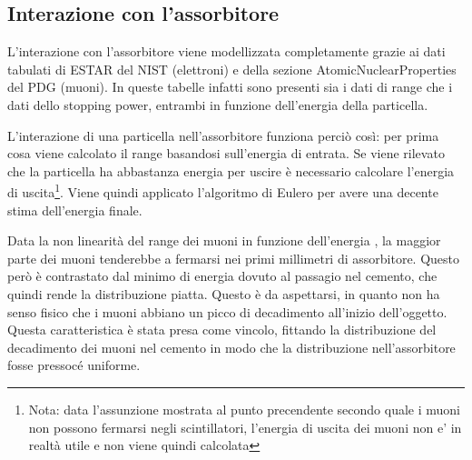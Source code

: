 \subsection{Interazione con l'assorbitore}
L'interazione con l'assorbitore viene modellizzata completamente grazie ai dati tabulati di ESTAR del NIST (elettroni) e della sezione AtomicNuclearProperties del PDG (muoni). In queste tabelle infatti sono presenti sia i dati di range che i dati dello stopping power, entrambi in funzione dell'energia della particella.

L'interazione di una particella nell'assorbitore funziona perci\`o cos\`i: per prima cosa viene calcolato il range basandosi sull'energia di entrata. 
Se viene rilevato che la particella ha abbastanza energia per uscire \`e necessario calcolare l'energia di uscita\footnote{Nota: data l'assunzione mostrata al punto precendente secondo quale i muoni non possono fermarsi negli scintillatori, l'energia di uscita dei muoni non e' in realt\`a utile e non viene quindi calcolata}. 
Viene quindi applicato l'algoritmo di Eulero per avere una decente stima dell'energia finale.

Data la non linearit\`a del range dei muoni in funzione dell'energia , la maggior parte dei muoni tenderebbe a fermarsi nei primi millimetri di assorbitore. Questo per\`o \`e contrastato dal minimo di energia dovuto al passagio nel cemento, che quindi rende la distribuzione piatta. Questo \`e da aspettarsi, in quanto non ha senso fisico che i muoni abbiano un picco di decadimento all'inizio dell'oggetto. Questa caratteristica \`e stata presa come vincolo, fittando la distribuzione del decadimento dei muoni nel cemento in modo che la distribuzione nell'assorbitore fosse pressoc\'e uniforme.
